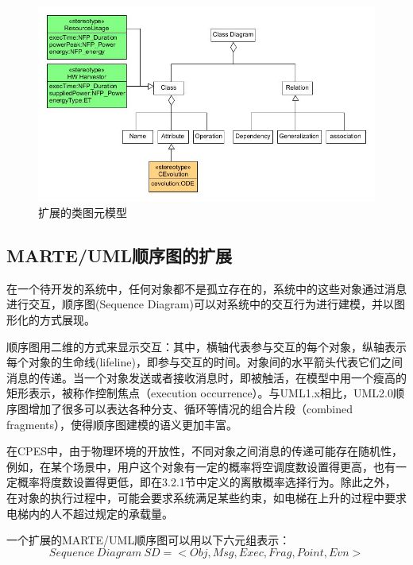 	\begin{figure}[!t]
	\centering
	\includegraphics[width=4.8in]{metamodel-CD.jpg}
	\caption{扩展的类图元模型}
	\label{metamodel-class}
	\end{figure}
	
\subsection{MARTE/UML顺序图的扩展}	
\label{2.3.2}
	在一个待开发的系统中，任何对象都不是孤立存在的，系统中的这些对象通过消息进行交互，顺序图(Sequence Diagram)可以对系统中的交互行为进行建模，并以图形化的方式展现。

	顺序图用二维的方式来显示交互：其中，横轴代表参与交互的每个对象，纵轴表示每个对象的生命线(lifeline)，即参与交互的时间。对象间的水平箭头代表它们之间消息的传递。当一个对象发送或者接收消息时，即被触活，在模型中用一个瘦高的矩形表示，被称作控制焦点（execution occurrence）。与UML1.x相比，UML2.0顺序图增加了很多可以表达各种分支、循环等情况的组合片段（combined fragments），使得顺序图建模的语义更加丰富。
	
	在CPES中，由于物理环境的开放性，不同对象之间消息的传递可能存在随机性，例如，在某个场景中，用户这个对象有一定的概率将空调度数设置得更高，也有一定概率将度数设置得更低，即在3.2.1节中定义的离散概率选择行为。除此之外，在对象的执行过程中，可能会要求系统满足某些约束，如电梯在上升的过程中要求电梯内的人不超过规定的承载量。	
	
	一个扩展的MARTE/UML顺序图可以用以下六元组表示：
	\begin{equation}
	Sequence\ Diagram\ SD=<Obj, Msg, Exec, Frag, Point, Evn>
	\end{equation}
	
